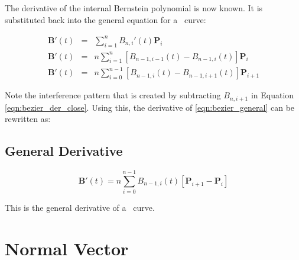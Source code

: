 \documentclass[oneside,usepdftitle=true]{article}
\begin{document}
The derivative of the internal Bernstein polynomial is now known.  It is substituted back into the general equation for a \Bezier\ curve:

\begin{eqnarray}
	\nonumber \mathbf{B}'(t) &=& \sum_{i=1}^{n} B_{n,i}'(t) \mathbf{P}_i \\
	\nonumber \mathbf{B}'(t) &=& n \sum_{i=1}^{n} [ B_{n-1,i-1}(t) - B_{n-1,i}(t) ] \mathbf{P}_i \\
	\label{eqn:bezier_der_close}
	\mathbf{B}'(t) &=& n \sum_{i=0}^{n-1} [ B_{n-1,i}(t) - B_{n-1,i+1}(t) ] \mathbf{P}_{i+1}
\end{eqnarray}

Note the interference pattern that is created by subtracting $B_{n,i+1}$ in Equation \eqref{eqn:bezier_der_close}{.}  Using this, the derivative of \eqref{eqn:bezier_general} can be rewritten as:

\subsection{General Derivative}\label{sec:gen_deriv}

\begin{equation}\label{eqn:bezier_deriv}
	\mathbf{B}'(t) = n \sum_{i=0}^{n-1} B_{n-1,i}(t) [ \mathbf{P}_{i+1} - \mathbf{P}_i ]
\end{equation}

This is the general derivative of a \Bezier\ curve.




\section{Normal Vector}
\end{document}
